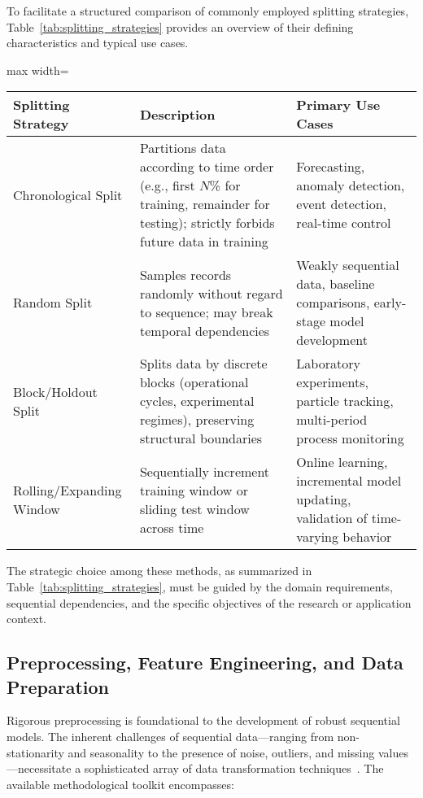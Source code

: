 To facilitate a structured comparison of commonly employed splitting strategies, Table~\ref{tab:splitting_strategies} provides an overview of their defining characteristics and typical use cases.

\begin{table*}[htbp]
\centering
\caption{Comparison of Common Sequential Data Splitting Strategies}
\label{tab:splitting_strategies}
\begin{adjustbox}{max width=\textwidth}
\begin{tabular}{lll}
\toprule
\textbf{Splitting Strategy} & \textbf{Description} & \textbf{Primary Use Cases} \\
\midrule
Chronological Split & Partitions data according to time order (e.g., first $N$\% for training, remainder for testing); strictly forbids future data in training & Forecasting, anomaly detection, event detection, real-time control \\
Random Split & Samples records randomly without regard to sequence; may break temporal dependencies & Weakly sequential data, baseline comparisons, early-stage model development \\
Block/Holdout Split & Splits data by discrete blocks (operational cycles, experimental regimes), preserving structural boundaries & Laboratory experiments, particle tracking, multi-period process monitoring \\
Rolling/Expanding Window & Sequentially increment training window or sliding test window across time & Online learning, incremental model updating, validation of time-varying behavior \\
\bottomrule
\end{tabular}
\end{adjustbox}
\end{table*}

The strategic choice among these methods, as summarized in Table~\ref{tab:splitting_strategies}, must be guided by the domain requirements, sequential dependencies, and the specific objectives of the research or application context.

\subsection{Preprocessing, Feature Engineering, and Data Preparation}

Rigorous preprocessing is foundational to the development of robust sequential models. The inherent challenges of sequential data—ranging from non-stationarity and seasonality to the presence of noise, outliers, and missing values—necessitate a sophisticated array of data transformation techniques~\cite{ref5}. The available methodological toolkit encompasses:

